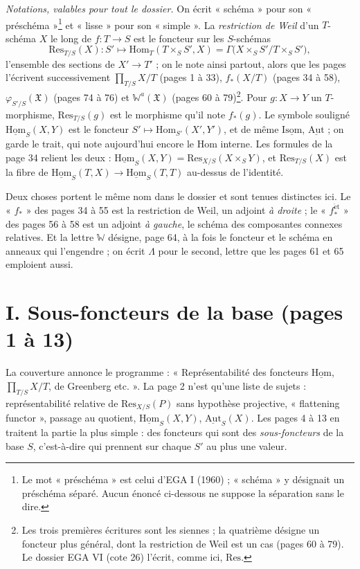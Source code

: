 \documentclass[11pt,a4paper]{article}
\begin{document}
\emph{Notations, valables pour tout le dossier.} On écrit « schéma » pour son
« préschéma »\footnote{Le mot « préschéma » est celui d'EGA I (1960) ;
« schéma » y désignait un préschéma séparé. Aucun énoncé ci-dessous ne
suppose la séparation sans le dire.} et « lisse » pour son « simple ». La
\emph{restriction de Weil} d'un $T$-schéma $X$ le long de $f : T \to S$ est le
foncteur sur les $S$-schémas
\[
  \mathrm{Res}_{T/S}(X) : S' \longmapsto \mathrm{Hom}_{T}(T \times_S S', X)
  = \Gamma\bigl(X \times_S S' / T \times_S S'\bigr),
\]
l'ensemble des sections de $X' \to T'$ ; on le note ainsi partout, alors que
les pages l'écrivent successivement $\prod_{T/S} X/T$ (pages 1 à 33),
$f_{*}(X/T)$ (pages 34 à 58), $\varphi_{S'/S}(\mathfrak{X})$ (pages 74 à 76) et
$\mathbb{W}^{a}(\mathfrak{X})$ (pages 60 à 79)\footnote{Les trois premières
écritures sont les siennes ; la quatrième désigne un foncteur plus général,
dont la restriction de Weil est un cas (pages 60 à 79). Le dossier EGA VI
(cote 26) l'écrit, comme ici, $\mathrm{Res}$.}. Pour $g : X \to Y$ un
$T$-morphisme, $\mathrm{Res}_{T/S}(g)$ est le morphisme qu'il note $f_{*}(g)$.
Le symbole souligné $\underline{\mathrm{Hom}}_S(X,Y)$ est le foncteur
$S' \mapsto \mathrm{Hom}_{S'}(X', Y')$, et de même
$\underline{\mathrm{Isom}}$, $\underline{\mathrm{Aut}}$ ; on garde le trait,
qui note aujourd'hui encore le Hom interne. Les formules de la page 34
relient les deux : $\underline{\mathrm{Hom}}_S(X,Y) = \mathrm{Res}_{X/S}(X
\times_S Y)$, et $\mathrm{Res}_{T/S}(X)$ est la fibre de
$\underline{\mathrm{Hom}}_S(T,X) \to \underline{\mathrm{Hom}}_S(T,T)$ au-dessus
de l'identité.

Deux choses portent le même nom dans le dossier et sont tenues distinctes
ici. Le « $f_{*}$ » des pages 34 à 55 est la restriction de Weil, un
adjoint \emph{à droite} ; le « $f_{*}^{\mathrm{\acute{e}t}}$ » des pages 56 à 58
est un adjoint \emph{à gauche}, le schéma des composantes connexes relatives.
Et la lettre $\mathbb{W}$ désigne, page 64, à la fois le foncteur et le schéma en
anneaux qui l'engendre ; on écrit $\Lambda$ pour le second, lettre que les
pages 61 et 65 emploient aussi.

\section*{I. Sous-foncteurs de la base (pages 1 à 13)}

La couverture annonce le programme : « Représentabilité des foncteurs
$\underline{\mathrm{Hom}}$, $\prod_{T/S} X/T$, de Greenberg etc. ». La page 2
n'est qu'une liste de sujets : représentabilité relative de
$\mathrm{Res}_{X/S}(P)$ sans hypothèse projective, « flattening functor »,
passage au quotient, $\underline{\mathrm{Hom}}_S(X,Y)$,
$\underline{\mathrm{Aut}}_S(X)$. Les pages 4 à 13 en traitent la partie la plus
simple : des foncteurs qui sont des \emph{sous-foncteurs} de la base $S$,
c'est-à-dire qui prennent sur chaque $S'$ au plus une valeur.
\end{document}
